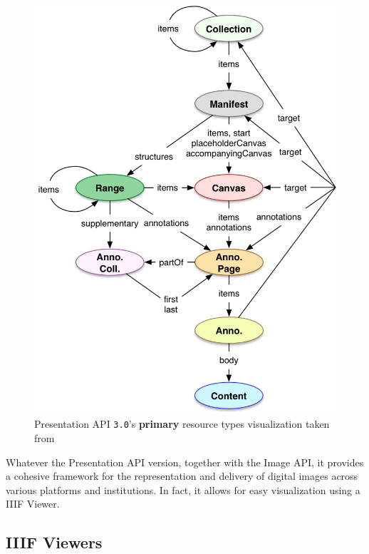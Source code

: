 \begin{figure}[htbp]
    \centering
	\includegraphics[height=0.6\textheight]{images/pres_api_3.png}
	\caption{Presentation API \texttt{3.0}'s \textbf{primary} resource types visualization taken from \citet{appleby2020presentation}}
	\label{fig:pres_api_3}
\end{figure}

Whatever the Presentation API version, together with the Image API, it provides a cohesive framework for the representation and delivery of digital images across various platforms and institutions. In fact, it allows for easy visualization using a IIIF Viewer. \citep{snydman2015international}

\subsection{IIIF Viewers}


